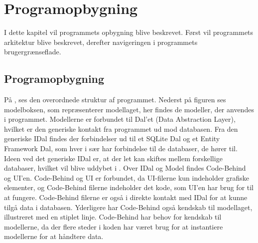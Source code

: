 \chapter{Programopbygning}

I dette kapitel vil programmets opbygning blive beskrevet. 
Først vil programmets arkitektur blive beskrevet, derefter navigeringen i programmets brugergrænseflade. 


\section{Programopbygning}\label{sec:programopbygning}



På , ses den overordnede struktur af programmet.
Nederst på figuren ses modelboksen, som repræsenterer modellaget, her findes de modeller, der anvendes i programmet.
Modellerne er forbundet til Dal'et (Data Abstraction Layer), hvilket er den generiske kontakt fra programmet ud mod databasen. 	
Fra den generiske IDal findes der forbindelser ud til et SQLite Dal og et Entity Framework Dal, som hver i sær har forbindelse til de databaser, de hører til. 
Ideen ved det generiske IDal er, at der let kan skiftes mellem forskellige databaser, hvilket vil blive uddybet i .
Over IDal og Model findes Code-Behind og UI'en.  
Code-Behind og UI er forbundet, da UI-filerne kun indeholder grafiske elementer, og Code-Behind filerne indeholder det kode, som UI'en har brug for til at fungere.
Code-Behind filerne er også i direkte kontakt med IDal  for at kunne tilgå data i databasen.
Yderligere har Code-Behind også kendskab til modellaget, illustreret med en stiplet linje.
Code-Behind har behov for kendskab til modellerne, da der flere steder i koden har været brug for at instantiere modellerne for at håndtere data. 